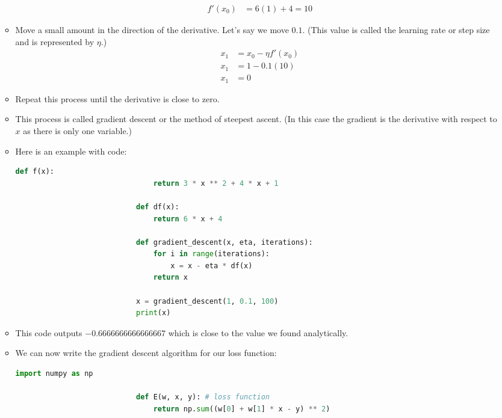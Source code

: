 \documentclass[12pt]{article}
\begin{document}
\begin{itemize}
\begin{itemize}
\begin{align*}
                            f'(x_0) &= 6(1) + 4 = 10
                        \end{align*}
                        \item Move a small amount in the direction of the derivative. Let's say we move $0.1$. (This value is called the learning rate or step size and is represented by $\eta$.)
                        \begin{align*}
                            x_1 &= x_0 - \eta f'(x_0)\\
                            x_1 &= 1 - 0.1(10)\\
                            x_1 &= 0
                        \end{align*}
                        \item Repeat this process until the derivative is close to zero.
                        \item This process is called gradient descent or the method of steepest ascent. (In this case the gradient is the derivative with respect to $x$ as there is only one variable.)
                        \item Here is an example with code:
                        \begin{lstlisting}[language=Python,gobble=28]
                            def f(x):
                                return 3 * x ** 2 + 4 * x + 1

                            def df(x):
                                return 6 * x + 4

                            def gradient_descent(x, eta, iterations):
                                for i in range(iterations):
                                    x = x - eta * df(x)
                                return x

                            x = gradient_descent(1, 0.1, 100)
                            print(x)
                        \end{lstlisting}
                        \item This code outputs $-0.6666666666666667$ which is close to the value we found analytically.
                        \item We can now write the gradient descent algorithm for our loss function:
                        \begin{lstlisting}[language=Python,gobble=28]
                            import numpy as np

                            def E(w, x, y): # loss function
                                return np.sum((w[0] + w[1] * x - y) ** 2)


\end{lstlisting}
\end{itemize}
\end{itemize}
\end{document}
